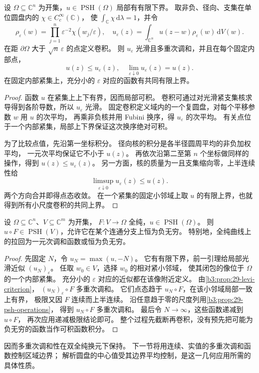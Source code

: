 \begin{lemma}[有下界函数的局部磨光]\label{b3:lem:29-psh-smoothing}
设 \(\Omega\subseteq\mathbb C^n\) 为开集，\(u\in\operatorname{PSH}(\Omega)\)
局部有有限下界。
取非负、径向、支集在单位圆盘内的 \(\chi\in C_c^\infty(\mathbb C)\)，
使 \(\int_{\mathbb C}\chi\,\mathrm d\lambda=1\)，并令
\[
 \rho_\varepsilon(w)
 =\prod_{j=1}^n\varepsilon^{-2}\chi(w_j/\varepsilon),\quad
 u_\varepsilon(z)=\int_{\mathbb C^n}u(z-w)\rho_\varepsilon(w)\,\mathrm dV(w).
\]
在距 \(\partial\Omega\) 大于 \(\sqrt n\,\varepsilon\) 的点定义卷积。
则 \(u_\varepsilon\) 光滑且多重次调和，并且在每个固定内部点，
\[
 u(z)\le u_\varepsilon(z),\quad
 \lim_{\varepsilon\downarrow0}u_\varepsilon(z)=u(z).
\]
在固定内部紧集上，充分小的 \(\varepsilon\) 对应的函数有共同有限上界。
\end{lemma}
\begin{proof}
函数 \(u\) 在紧集上上下有界，因而局部可积。
卷积可通过对光滑紧支集核求导得到各阶导数，所以 \(u_\varepsilon\) 光滑。
固定卷积定义域内的一个复圆盘，对每个平移参数 \(w\) 用 \(u\) 的次平均，
再乘非负核并用 Fubini 换序，得 \(u_\varepsilon\) 的次平均。
有关点位于一个内部紧集，局部上下界保证这次换序绝对可积。

为了比较点值，先沿第一坐标积分。
径向核的积分是各半径圆周平均的非负加权平均，
一元次平均保证它不小于 \(u(z)\)。
再依次沿第二至第 \(n\) 个坐标做同样的操作，得到
\(u(z)\le u_\varepsilon(z)\)。
另一方面，核的质量为一且支集缩向零，上半连续性给
\[
 \limsup_{\varepsilon\downarrow0}u_\varepsilon(z)\le u(z).
\]
两个方向合并即得点态收敛。
在一个紧集的固定小邻域上取 \(u\) 的有限上界，也就得到所有小尺度卷积的共同上界。
\end{proof}

\begin{proposition}[全纯拉回]\label{b3:prop:29-psh-pullback}
设 \(\Omega\subseteq\mathbb C^n\)、\(V\subseteq\mathbb C^m\) 为开集，
\(F:V\to\Omega\) 全纯，\(u\in\operatorname{PSH}(\Omega)\)。
则 \(u\circ F\in\operatorname{PSH}(V)\)，允许它在某个连通分支上恒为负无穷。
特别地，全纯曲线上的拉回为一元次调和函数或恒为负无穷。
\end{proposition}
\begin{proof}
先固定 \(N\)，令 \(u_N=\max(u,-N)\)。
它有有限下界，前一引理给局部光滑近似 \((u_N)_\varepsilon\)。
任取 \(w_0\in V\)，选择 \(w_0\) 的相对紧小邻域，
使其闭包的像位于 \(\Omega\) 的一个内部紧集。
充分小的 \(\varepsilon\) 对应的近似都在该像附近定义。
由\cref{b3:prop:29-levi-criterion}，
\((u_N)_\varepsilon\circ F\) 多重次调和。
它们点态趋于 \(u_N\circ F\)，在该小邻域局部一致上有界，
极限又因 \(F\) 连续而上半连续。
沿任意趋于零的尺度列用\cref{b3:prop:29-psh-operations}，
得到 \(u_N\circ F\) 多重次调和。
最后令 \(N\to\infty\)，这些函数递减到 \(u\circ F\)，
再次应用递减极限结论即可。
整个过程先截断再卷积，没有预先把可能为负无穷的函数当作可积函数积分。
\end{proof}

因而多重次调和性在双全纯换元下保持。
下一节将用连续、实值的多重次调和函数控制区域边界；
解析圆盘的中心值受其边界平均控制，是这一几何应用所需的具体性质。
